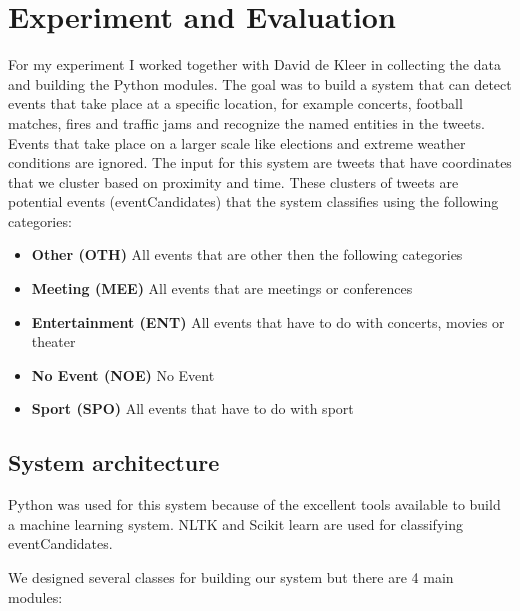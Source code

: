 \documentclass[
10pt, %
a4paper, %
oneside, %
headinclude,footinclude, %
BCOR5mm, %
]{scrartcl}
\begin{document}
\newpage
\section{Experiment and Evaluation}
For my experiment I worked together with David de Kleer in collecting the data and building the Python modules. The goal was to build a system that can detect events that take place at a specific location, for example concerts, football matches, fires and traffic jams and recognize the named entities in the tweets.  Events that take place on a larger scale like elections and extreme weather conditions are ignored. The input for this system are tweets that have coordinates that we cluster based on proximity and time. These clusters of tweets are potential events (eventCandidates) that the system classifies using the following categories: \\

\begin{itemize}[noitemsep] %
\item \textbf{Other (OTH)} All events that are other then the following categories 
\item \textbf{Meeting (MEE)} All events that are meetings or conferences 
\item \textbf{Entertainment (ENT)} All events that have to do with concerts, movies or theater
\item \textbf{No Event (NOE)} No Event
\item \textbf{Sport (SPO)} All events that have to do with sport 
\end{itemize}



\subsection{System architecture}
Python was used for this system because of the excellent tools available to build a machine learning system. NLTK and Scikit learn are used for classifying eventCandidates.

We designed several classes for building our system but there are 4 main modules:
\end{document}
